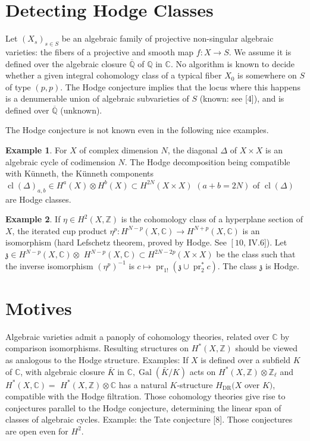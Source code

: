 \documentclass[12pt,twoside]{book}
\theoremstyle{plain}
\theoremstyle{definition}
\newtheorem{example}[example]{Example}
\theoremstyle{remark}
\numberwithin{equation}{section}
\begin{document}
\section{\bf Detecting Hodge Classes}\label{sec: Detecting Hodge Classes}
Let $\left(X_s\right)_{s \in S}$ be an algebraic family of projective non-singular algebraic varieties: the fibers of a projective and smooth map $f: X \rightarrow S$. We assume it is defined over the algebraic closure $\overline{\mathbb{Q}}$ of $\mathbb{Q}$ in $\mathbb{C}$. No algorithm is known to decide whether a given integral cohomology class of a typical fiber $X_0$ is somewhere on $S$ of type $(p, p)$. The Hodge conjecture implies that the locus where this happens is a denumerable union of algebraic subvarieties of $S$ (known: see [4]), and is defined over $\overline{\mathbb{Q}}$ (unknown).

The Hodge conjecture is not known even in the following nice examples.
\begin{example}\label{exam: 1}
  For $X$ of complex dimension $N$, the diagonal $\Delta$ of $X \times X$ is an algebraic cycle of codimension $N$. The Hodge decomposition being compatible with Künneth, the Künneth components $\operatorname{cl}(\Delta)_{a, b} \in H^a(X) \otimes H^b(X) \subset H^{2 N}(X \times X)$ $(a+b=2 N)$ of $\operatorname{cl}(\Delta)$ are Hodge classes.
\end{example}
\begin{example}\label{exam: 2}
  If $\eta \in H^2(X, \mathbb{Z})$ is the cohomology class of a hyperplane section of $X$, the iterated cup product $\eta^p: H^{N-p}(X, \mathbb{C}) \rightarrow H^{N+p}(X, \mathbb{C})$ is an isomorphism (hard Lefschetz theorem, proved by Hodge. See $\left[10\right.$, IV.6]). Let $\mathfrak{z} \in H^{N-p}(X, \mathbb{C}) \otimes$ $H^{N-p}(X, \mathbb{C}) \subset H^{2 N-2 p}(X \times X)$ be the class such that the inverse isomorphism $\left(\eta^p\right)^{-1}$ is $c \mapsto \operatorname{pr}_{1 !}\left(\mathfrak{z} \cup \operatorname{pr}_2^* c\right)$. The class $\mathfrak{z}$ is Hodge.
\end{example}
\section{\bf Motives}
Algebraic varieties admit a panoply of cohomology theories, related over $\mathbb{C}$ by comparison isomorphisms. Resulting structures on $H^*(X, \mathbb{Z})$ should be viewed as analogous to the Hodge structure. Examples: If $X$ is defined over a subfield $K$ of $\mathbb{C}$, with algebraic closure $\bar{K}$ in $\mathbb{C}, \operatorname{Gal}(\bar{K} / K)$ acts on $H^*(X, \mathbb{Z}) \otimes \mathbb{Z}_{\ell}$ and $H^*(X, \mathbb{C})=$ $H^*(X, \mathbb{Z}) \otimes \mathbb{C}$ has a natural $K$-structure $H_{\mathrm{DR}}(X$ over $K)$, compatible with the Hodge filtration. Those cohomology theories give rise to conjectures parallel to the Hodge conjecture, determining the linear span of classes of algebraic cycles. Example: the Tate conjecture [8]. Those conjectures are open even for $H^2$.
\end{document}
